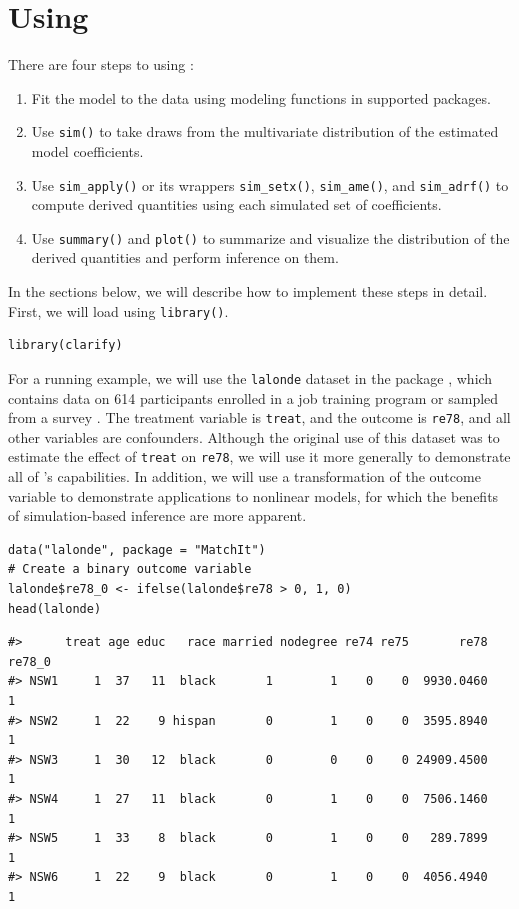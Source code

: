 \section{\texorpdfstring{Using }{Using }}\label{using}
There are four steps to using :
\begin{enumerate}
\def\labelenumi{\arabic{enumi}.}
\item
  Fit the model to the data using modeling functions in supported packages.
\item
  Use \texttt{sim()} to take draws from the multivariate distribution of the estimated model coefficients.
\item
  Use \texttt{sim\_apply()} or its wrappers \texttt{sim\_setx()}, \texttt{sim\_ame()}, and \texttt{sim\_adrf()} to compute derived quantities using each simulated set of coefficients.
\item
  Use \texttt{summary()} and \texttt{plot()} to summarize and visualize the distribution of the derived quantities and perform inference on them.
\end{enumerate}
In the sections below, we will describe how to implement these steps in detail. First, we will load  using \texttt{library()}.
\begin{verbatim}
library(clarify)
\end{verbatim}
For a running example, we will use the \texttt{lalonde} dataset in the  package \citep{JSSv042i08}, which contains data on 614 participants enrolled in a job training program or sampled from a survey \citep{dehejiaCausalEffectsNonexperimental1999}. The treatment variable is \texttt{treat}, and the outcome is \texttt{re78}, and all other variables are confounders. Although the original use of this dataset was to estimate the effect of \texttt{treat} on \texttt{re78}, we will use it more generally to demonstrate all of 's capabilities. In addition, we will use a transformation of the outcome variable to demonstrate applications to nonlinear models, for which the benefits of simulation-based inference are more apparent.
\begin{verbatim}
data("lalonde", package = "MatchIt")
# Create a binary outcome variable
lalonde$re78_0 <- ifelse(lalonde$re78 > 0, 1, 0)
head(lalonde)
\end{verbatim}
\begin{verbatim}
#>      treat age educ   race married nodegree re74 re75       re78 re78_0
#> NSW1     1  37   11  black       1        1    0    0  9930.0460      1
#> NSW2     1  22    9 hispan       0        1    0    0  3595.8940      1
#> NSW3     1  30   12  black       0        0    0    0 24909.4500      1
#> NSW4     1  27   11  black       0        1    0    0  7506.1460      1
#> NSW5     1  33    8  black       0        1    0    0   289.7899      1
#> NSW6     1  22    9  black       0        1    0    0  4056.4940      1
\end{verbatim}
